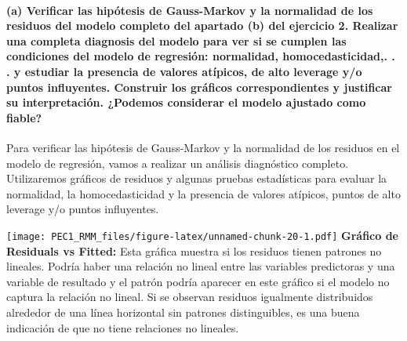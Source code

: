 \documentclass[
]{article}
\begin{document}
\hypertarget{a-verificar-las-hipuxf3tesis-de-gauss-markov-y-la-normalidad-de-los-residuos-del-modelo-completo-del-apartado-b-del-ejercicio-2.-realizar-una-completa-diagnosis-del-modelo-para-ver-si-se-cumplen-las-condiciones-del-modelo-de-regresiuxf3n-normalidad-homocedasticidad.-.-.-y-estudiar-la-presencia-de-valores-atuxedpicos-de-alto-leverage-yo-puntos-influyentes.-construir-los-gruxe1ficos-correspondientes-y-justificar-su-interpretaciuxf3n.-podemos-considerar-el-modelo-ajustado-como-fiable}{%
\paragraph{\texorpdfstring{\textbf{(a) Verificar las hipótesis de
Gauss-Markov y la normalidad de los residuos del modelo completo del
apartado (b) del ejercicio 2. Realizar una completa diagnosis del modelo
para ver si se cumplen las condiciones del modelo de regresión:
normalidad, homocedasticidad,. . . y estudiar la presencia de valores
atípicos, de alto leverage y/o puntos influyentes. Construir los
gráficos correspondientes y justificar su interpretación. ¿Podemos
considerar el modelo ajustado como
fiable?}}{(a) Verificar las hipótesis de Gauss-Markov y la normalidad de los residuos del modelo completo del apartado (b) del ejercicio 2. Realizar una completa diagnosis del modelo para ver si se cumplen las condiciones del modelo de regresión: normalidad, homocedasticidad,. . . y estudiar la presencia de valores atípicos, de alto leverage y/o puntos influyentes. Construir los gráficos correspondientes y justificar su interpretación. ¿Podemos considerar el modelo ajustado como fiable?}}\label{a-verificar-las-hipuxf3tesis-de-gauss-markov-y-la-normalidad-de-los-residuos-del-modelo-completo-del-apartado-b-del-ejercicio-2.-realizar-una-completa-diagnosis-del-modelo-para-ver-si-se-cumplen-las-condiciones-del-modelo-de-regresiuxf3n-normalidad-homocedasticidad.-.-.-y-estudiar-la-presencia-de-valores-atuxedpicos-de-alto-leverage-yo-puntos-influyentes.-construir-los-gruxe1ficos-correspondientes-y-justificar-su-interpretaciuxf3n.-podemos-considerar-el-modelo-ajustado-como-fiable}}

Para verificar las hipótesis de Gauss-Markov y la normalidad de los
residuos en el modelo de regresión, vamos a realizar un análisis
diagnóstico completo. Utilizaremos gráficos de residuos y algunas
pruebas estadísticas para evaluar la normalidad, la homocedasticidad y
la presencia de valores atípicos, puntos de alto leverage y/o puntos
influyentes.

\texttt{[image: PEC1\_RMM\_files/figure-latex/unnamed-chunk-20-1.pdf]}
\textbf{Gráfico de Residuals vs Fitted:} Esta gráfica muestra si los
residuos tienen patrones no lineales. Podría haber una relación no
lineal entre las variables predictoras y una variable de resultado y el
patrón podría aparecer en este gráfico si el modelo no captura la
relación no lineal. Si se observan residuos igualmente distribuidos
alrededor de una línea horizontal sin patrones distinguibles, es una
buena indicación de que no tiene relaciones no lineales.
\end{document}
